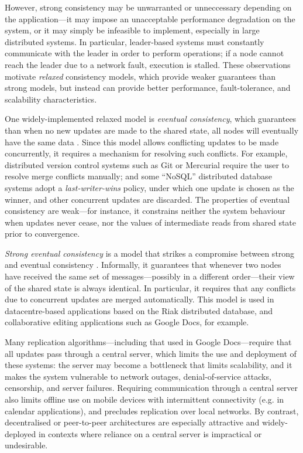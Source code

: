 \documentclass[acmlarge,review,anonymous]{acmart}\settopmatter{printfolios=true}
\begin{document}
However, strong consistency may be unwarranted or unneccessary depending on the application---it may impose an unacceptable performance degradation on the system, or it may simply be infeasible to implement, especially in large distributed systems.
In particular, leader-based systems must constantly communicate with the leader in order to perform operations; if a node cannot reach the leader due to a network fault, execution is stalled.
These observations motivate \emph{relaxed} consistency models, which provide weaker guarantees than strong models, but instead can provide better performance, fault-tolerance, and scalability characteristics.

One widely-implemented relaxed model is \emph{eventual consistency}, which guarantees than when no new updates are made to the shared state, all nodes will eventually have the same data \cite{Bailis:2013jc,Burckhardt:2014hy,Terry:1994fp,Vogels:2009ca}.
Since this model allows conflicting updates to be made concurrently, it requires a mechanism for resolving such conflicts.
For example, distributed version control systems such as Git or Mercurial require the user to resolve merge conflicts manually; and some ``NoSQL'' distributed database systems adopt a \emph{last-writer-wins} policy, under which one update is chosen as the winner, and other concurrent updates are discarded.
The properties of eventual consistency are weak---for instance, it constrains neither the system behaviour when updates never cease, nor the values of intermediate reads from shared state prior to convergence.

\emph{Strong eventual consistency} is a model that strikes a compromise between strong and eventual consistency \cite{Shapiro:2011un}.
Informally, it guarantees that whenever two nodes have received the same set of messages---possibly in a different order---their view of the shared state is always identical.
In particular, it requires that any conflicts due to concurrent updates are merged automatically.
This model is used in datacentre-based applications based on the Riak distributed database, and collaborative editing applications such as Google Docs, for example.

Many replication algorithms---including that used in Google Docs---require that all updates pass through a central server, which limits the use and deployment of these systems: the server may become a bottleneck that limits scalability, and it makes the system vulnerable to network outages, denial-of-service attacks, censorship, and server failures.
Requiring communication through a central server also limits offline use on mobile devices with intermittent connectivity (e.g. in calendar applications), and precludes replication over local networks.
By contrast, decentralised or peer-to-peer architectures are especially attractive and widely-deployed in contexts where reliance on a central server is impractical or undesirable.
\end{document}
